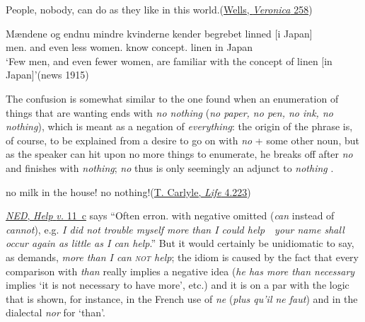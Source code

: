 \ea \label{ex:07-113}
 People, nobody, can do as they like in this world.\hfill(\href{https://archive.org/details/annveronicamoder0000hgwe/page/272/mode/2up?q=%22people%2C+nobody%22&view=theater}{Wells, \textit{Veronica} 258})
\z



\ea \label{ex:07-114}
\gll Mændene og endnu mindre kvinderne kender begrebet linned [i Japan]\\
 men.\DEF{} and even less women.\DEF{} know concept.\DEF{} linen in Japan\\
\glt `Few men, and even fewer women, are familiar with the concept of linen [in Japan]'\hfill(news 1915)
\z

The confusion is somewhat similar to the one found when an enumeration of things that are wanting ends with \textit{no nothing} (\textit{no paper, no pen, no ink, no nothing}), which is meant as a negation of \textit{everything}: the origin of the phrase is, of course, to be explained from a desire to go on with \textit{no} + some other noun, but as the speaker can hit upon no more things to enumerate, he breaks off after \textit{no} and finishes with \textit{nothing}; \textit{no} thus is only seemingly an adjunct to \textit{nothing} .

\ea \label{ex:07-115} no milk in the house! no nothing!\hfill(\href{https://archive.org/details/a582677302frouuoft/page/n233/mode/2up?q=%22no+milk%22&view=theater}{T. Carlyle, \textit{Life} 4.223})
\z

\href{https://archive.org/details/newenglishdict05murrmiss/page/n231/mode/2up?view=theater}{\textit{NED}, \textit{Help} \textit{v.} 11~c} says ``Often erron. with negative omitted (\textit{can} instead of \textit{cannot}), e.g. \textit{I did not trouble myself more than I could help}~\vert~\textit{your name shall occur again as little as I can help}.'' But it would certainly be unidiomatic to say, as \citet[\href{https://archive.org/details/miscellaneousre01whatgoog/page/n314/mode/2up?view=theater}{296}]{whately1866miscellaneous} demands, \textit{more than I can \textsc{not} help}; %
the idiom is caused by the fact that every comparison with \textit{than} really implies a negative idea (\textit{he has more than necessary} implies `it is not necessary to have more', etc.) and it is on a par with the logic that is shown, for instance, in the French use of \textit{ne} (\textit{plus qu'il ne faut}) and in the dialectal \textit{nor} for `than'.

